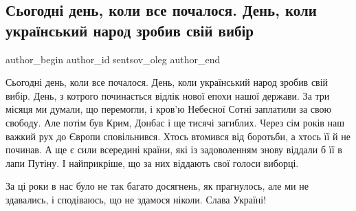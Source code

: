  
 
 
 
 
 
\subsection{Сьогодні день, коли все почалося. День, коли український народ зробив свій вибір}
\label{sec:21_11_2020.fb.sentsov_oleg.1.den_narod_vybir}
\ifcmt
	author_begin
   author_id sentsov_oleg
	author_end
\fi

Сьогодні день, коли все почалося. День, коли український народ зробив свій
вибір. День, з котрого починається відлік нової епохи нашої держави. За три
місяця ми думали, що перемогли, і кров’ю Небесної Сотні заплатили за свою
свободу. Але потім був Крим, Донбас і ще тисячі загиблих. Через сім років наш
важкий рух до Європи сповільнився. Хтось втомився від боротьби, а хтось її й не
починав. А ще є сили всередині країни, які із задоволенням знову віддали б її в
лапи Путіну. І найприкріше, що за них віддають свої голоси виборці. 

За ці роки в нас було не так багато досягнень, як прагнулось, але ми не
здавались, і сподіваюсь, що не здамося ніколи. Слава Україні!

